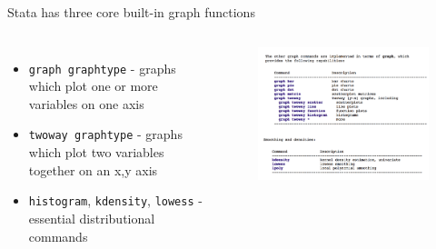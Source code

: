 \documentclass[aspectratio=169]{beamer}
\begin{document}
\begin{frame}[fragile]{Stata has three core built-in graph functions}
	\begin{columns}[c]
		\begin{itemize}
			\item \texttt{graph graphtype} - graphs which plot one or more variables on one axis
			\item \texttt{twoway graphtype} - graphs which plot two variables together on an x,y axis
			\item \texttt{histogram}, \texttt{kdensity}, \texttt{lowess} - essential distributional commands
		\end{itemize}
		\begin{figure}
			\centering
			\includegraphics[width=\linewidth]{img/graphcommand}
		\end{figure}
	\end{columns}
\end{frame}
\end{document}
